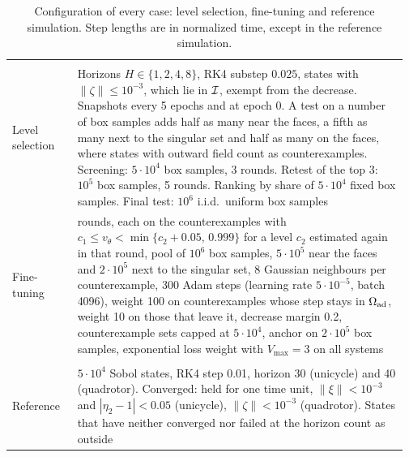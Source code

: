 \begin{table}[t]
\centering\footnotesize\renewcommand{\arraystretch}{1.1}
\caption{Configuration of every case: level selection, fine-tuning and reference simulation. Step lengths are in normalized time, except in the reference simulation.}
\label{tab:config2}
\begin{tabular}{@{}>{\raggedright\arraybackslash}p{0.16\linewidth}>{\raggedright\arraybackslash}p{0.81\linewidth}@{}}
\toprule
\multicolumn{2}{@{}l}{\textit{Level selection and fine-tuning}}\\
Level selection & Horizons $H\in\{1,2,4,8\}$, RK4 substep $0.025$, states with $\|\zeta\|\le10^{-3}$, which lie in $\mathcal I$, exempt from the decrease. Snapshots every 5 epochs and at epoch 0. A test on a number of box samples adds half as many near the faces, a fifth as many next to the singular set and half as many on the faces, where states with outward field count as counterexamples. Screening: $5\cdot10^4$ box samples, 3 rounds. Retest of the top 3: $10^5$ box samples, 5 rounds. Ranking by share of $5\cdot10^4$ fixed box samples. Final test: $10^6$ i.i.d.\ uniform box samples\\
Fine-tuning & 4 rounds, each on the counterexamples with $c_1\le v_\theta<\min\{c_2+0.05,\,0.999\}$ for a level $c_2$ estimated again in that round, pool of $10^6$ box samples, $5\cdot10^5$ near the faces and $2\cdot10^5$ next to the singular set, 8 Gaussian neighbours per counterexample, 300 Adam steps (learning rate $5\cdot10^{-5}$, batch 4096), weight 100 on counterexamples whose step stays in $\Omega_{\mathrm{ad}}$, weight 10 on those that leave it, decrease margin 0.2, counterexample sets capped at $5\cdot10^4$, anchor on $2\cdot10^5$ box samples, exponential loss weight with $V_{\max}=3$ on all systems\\
\midrule
\multicolumn{2}{@{}l}{\textit{Reference simulation}}\\
Reference & $5\cdot10^4$ Sobol states, RK4 step 0.01, horizon 30 (unicycle) and 40 (quadrotor). Converged: held for one time unit, $\|\xi\|<10^{-3}$ and $|\eta_2-1|<0.05$ (unicycle), $\|\zeta\|<10^{-3}$ (quadrotor). States that have neither converged nor failed at the horizon count as outside\\
\bottomrule
\end{tabular}
\end{table}

